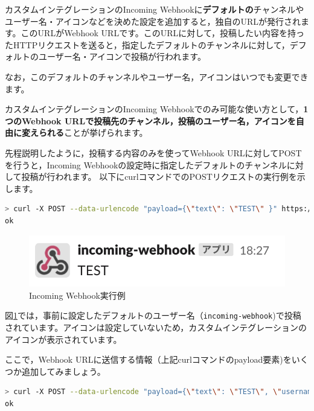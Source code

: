 \documentclass[uplatex,a4j]{jsarticle}
\begin{document}
カスタムインテグレーションのIncoming Webhookに\textbf{デフォルトの}チャンネルやユーザー名・アイコンなどを決めた設定を追加すると，独自のURLが発行されます。このURLがWebhook URLです。このURLに対して，投稿したい内容を持ったHTTPリクエストを送ると，指定したデフォルトのチャンネルに対して，デフォルトのユーザー名・アイコンで投稿が行われます。


なお，このデフォルトのチャンネルやユーザー名，アイコンはいつでも変更できます。

\clearpage
カスタムインテグレーションのIncoming Webhookでのみ可能な使い方として，\textbf{1つのWebhook URLで投稿先のチャンネル，投稿のユーザー名，アイコンを自由に変えられる}ことが挙げられます。

先程説明したように，投稿する内容のみを使ってWebhook URLに対してPOSTを行うと，Incoming Webhookの設定時に指定したデフォルトのチャンネルに対して投稿が行われます。
以下にcurlコマンドでのPOSTリクエストの実行例を示します。

\begin{lstlisting}[basicstyle=\ttfamily\footnotesize,language=bash,frame=single,caption=Curl sample]
> curl -X POST --data-urlencode "payload={\"text\": \"TEST\" }" https://hooks.slack.com/services/your/webhook/url
ok
\end{lstlisting}

\begin{figure}[h]
 \centering
 \includegraphics[keepaspectratio, scale=0.8]{images/webhook_sample2.png}
 \caption{Incoming Webhook実行例}
 \label{fig:webhook_sample2}
\end{figure}

図\ref{fig:webhook_sample2}では，事前に設定したデフォルトのユーザー名（\verb|incoming-webhook|)で投稿されています。アイコンは設定していないため，カスタムインテグレーションのアイコンが表示されています。

ここで，Webhook URLに送信する情報（上記curlコマンドのpayload要素)をいくつか追加してみましょう。

\begin{lstlisting}[basicstyle=\ttfamily\footnotesize,language=bash,frame=single,caption=Curl sample2]
> curl -X POST --data-urlencode "payload={\"text\": \"TEST\", \"username\": \"This is custom integration\", \"icon_emoji\": \":tada:\" }" https://hooks.slack.com/services/your/webhook/url
ok
\end{lstlisting}
\end{document}
